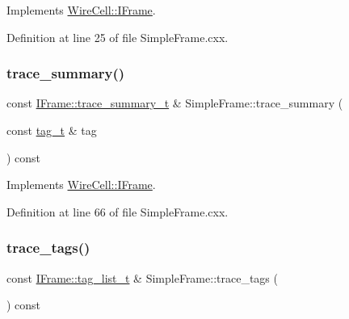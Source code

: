 Implements \hyperlink{class_wire_cell_1_1_i_frame_ae65ceeb2ebe5ef5371793a21a835b0df}{Wire\+Cell\+::\+I\+Frame}.



Definition at line 25 of file Simple\+Frame.\+cxx.

\mbox{\label{class_wire_cell_1_1_simple_frame_a3e564b456f19fa5f3afe7639c74ffb00}} 
\subsubsection{\texorpdfstring{trace\+\_\+summary()}{trace\_summary()}}
{\footnotesize\ttfamily const \hyperlink{class_wire_cell_1_1_i_frame_ad65f8b090c2607591e44d7b40777517e}{I\+Frame\+::trace\+\_\+summary\+\_\+t} \& Simple\+Frame\+::trace\+\_\+summary (\begin{DoxyParamCaption}\item[{const \hyperlink{class_wire_cell_1_1_i_frame_ae206ba618e10f398625dfeb675a4215a}{tag\+\_\+t} \&}]{tag }\end{DoxyParamCaption}) const\hspace{0.3cm}{\ttfamily [virtual]}}



Implements \hyperlink{class_wire_cell_1_1_i_frame_a4b2841b0245453235f223be1c67c2ff5}{Wire\+Cell\+::\+I\+Frame}.



Definition at line 66 of file Simple\+Frame.\+cxx.

\mbox{\label{class_wire_cell_1_1_simple_frame_af174d058e161ae60dd374deea25c725c}} 
\subsubsection{\texorpdfstring{trace\+\_\+tags()}{trace\_tags()}}
{\footnotesize\ttfamily const \hyperlink{class_wire_cell_1_1_i_frame_ab34485d40e352997c21b9ec99504ba7c}{I\+Frame\+::tag\+\_\+list\+\_\+t} \& Simple\+Frame\+::trace\+\_\+tags (\begin{DoxyParamCaption}{ }\end{DoxyParamCaption}) const\hspace{0.3cm}{\ttfamily [virtual]}}



